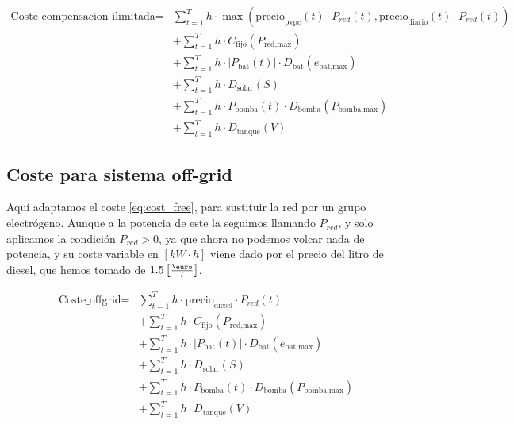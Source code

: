 \begin{equation} \label{eq:cost_free}
	\begin{split}
		\text{Coste\_compensacion\_ilimitada} = & \sum_{t=1}^{T} h \cdot \max(\text{precio}_\text{pvpc}(t) \cdot P_{red}(t), \text{precio}_\text{diario}(t) \cdot P_{red}(t)) \\
		                                        & + \sum_{t=1}^{T} h \cdot C_\text{fijo}(P_\text{red,max})                                                                    \\
		                                        & + \sum_{t=1}^{T} h \cdot |P_\text{bat}(t)| \cdot D_\text{bat}(e_\text{bat,max})                                             \\
		                                        & + \sum_{t=1}^{T} h \cdot D_\text{solar}(S)                                                                                  \\
		                                        & + \sum_{t=1}^{T} h \cdot P_\text{bomba}(t) \cdot D_\text{bomba}(P_\text{bomba,max})                                         \\
		                                        & + \sum_{t=1}^{T} h \cdot D_\text{tanque}(V)
	\end{split}
\end{equation}

\subsection{Coste para sistema off-grid}

Aquí adaptamos el coste \ref{eq:cost_free}, para sustituir la red por un grupo electrógeno.
Aunque a la potencia de este la seguimos llamando $P_{red}$, y solo aplicamos la condición $P_{red} > 0$,
ya que ahora no podemos volcar nada de potencia, y su coste variable en $[kW\cdot h]$ viene dado
por el precio del litro de diesel, que hemos tomado de $1.5 \left[\frac{\text{\euro}}{l}\right]$.

\begin{equation}
	\begin{split}
		\text{Coste\_offgrid} = & \sum_{t=1}^{T} h \cdot \text{precio}_\text{diesel} \cdot P_{red}(t)                 \\
		                        & + \sum_{t=1}^{T} h \cdot C_\text{fijo}(P_\text{red,max})                            \\
		                        & + \sum_{t=1}^{T} h \cdot |P_\text{bat}(t)| \cdot D_\text{bat}(e_\text{bat,max})     \\
		                        & + \sum_{t=1}^{T} h \cdot D_\text{solar}(S)                                          \\
		                        & + \sum_{t=1}^{T} h \cdot P_\text{bomba}(t) \cdot D_\text{bomba}(P_\text{bomba,max}) \\
		                        & + \sum_{t=1}^{T} h \cdot D_\text{tanque}(V)
	\end{split}
\end{equation}


